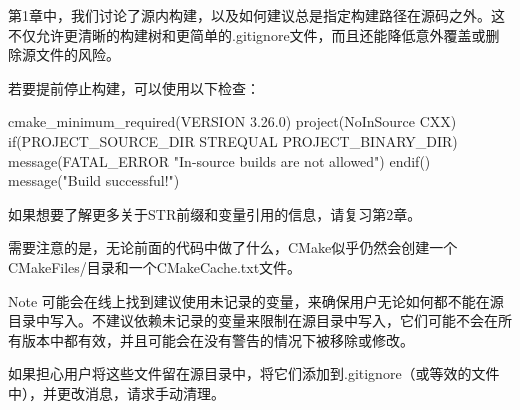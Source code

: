 
第1章中，我们讨论了源内构建，以及如何建议总是指定构建路径在源码之外。这不仅允许更清晰的构建树和更简单的.gitignore文件，而且还能降低意外覆盖或删除源文件的风险。

若要提前停止构建，可以使用以下检查：


\begin{cmake}
cmake_minimum_required(VERSION 3.26.0)
project(NoInSource CXX)
if(PROJECT_SOURCE_DIR STREQUAL PROJECT_BINARY_DIR)
    message(FATAL_ERROR "In-source builds are not allowed")
endif()
message("Build successful!")
\end{cmake}

如果想要了解更多关于STR前缀和变量引用的信息，请复习第2章。

需要注意的是，无论前面的代码中做了什么，CMake似乎仍然会创建一个CMakeFiles/目录和一个CMakeCache.txt文件。

\begin{myNotic}{Note}
可能会在线上找到建议使用未记录的变量，来确保用户无论如何都不能在源目录中写入。不建议依赖未记录的变量来限制在源目录中写入，它们可能不会在所有版本中都有效，并且可能会在没有警告的情况下被移除或修改。
\end{myNotic}

如果担心用户将这些文件留在源目录中，将它们添加到.gitignore（或等效的文件中），并更改消息，请求手动清理。

































